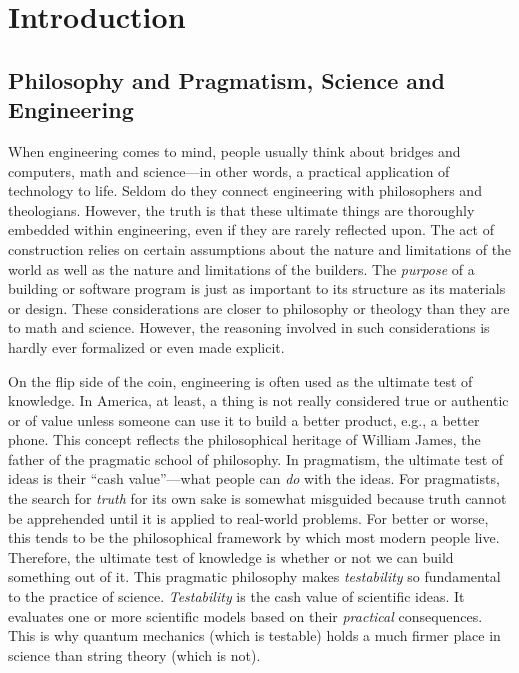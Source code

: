 \chapter{Introduction}

\section[Philosophy and Pragmatism]{Philosophy and Pragmatism, Science and Engineering}

When engineering comes to mind, people usually think about bridges and computers, math and science---in other words, a practical application of technology to life.  Seldom do they connect engineering with philosophers and theologians. However, the truth is that these ultimate things are thoroughly embedded within engineering, even if they are rarely reflected upon.  
The act of construction relies on certain assumptions about the nature and limitations of the world as well as the nature and limitations of the builders.  
The \textit{purpose} of a building or software program is just as important to its structure as its materials or design. 
These considerations are closer to philosophy or theology than they are to math and science.  However, the reasoning involved in such considerations is hardly ever
formalized or even made explicit.

On the flip side of the coin, engineering is often used as the ultimate test of knowledge. 
In America, at least, a thing is not really considered true or authentic or of value unless someone can use it to build a better product, e.g., a better phone.  
This concept reflects the philosophical heritage of William James, the father of the pragmatic school of philosophy.  In pragmatism, the ultimate test of ideas is their ``cash value''---what people can \textit{do} with the ideas.  For pragmatists, the search for \textit{truth} for its own sake is somewhat misguided because truth cannot be apprehended until it is applied to real-world problems.  For better or worse, this tends to be the philosophical framework by which most modern people live.  Therefore, the ultimate test of knowledge is whether or not we can build something out of it.  This pragmatic philosophy makes \textit{testability} so fundamental to the practice of science.  \textit{Testability} is the cash value of scientific ideas.  It evaluates one or more scientific models based on their \textit{practical} consequences.  This is why quantum mechanics (which is testable) holds a much firmer place in science than string theory (which is not). 

